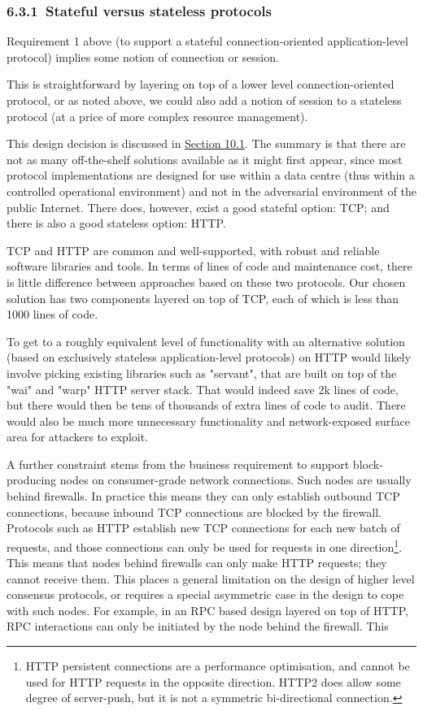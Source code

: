 \documentclass[]{article}
\begin{document}
\hypertarget{stateful-versus-stateless-protocols}{%
\subsubsection{​6.3.1​~Stateful versus stateless
protocols}\label{stateful-versus-stateless-protocols}}

Requirement 1 above (to support a stateful connection-oriented
application-level protocol) implies some notion of connection or
session.

This is straightforward by layering on top of a lower level
connection-oriented protocol, or as noted above, we could also add a
notion of session to a stateless protocol (at a price of more complex
resource management).

This design decision is discussed in
\protect\hyperlink{stateful-implementation}{{Section 10.1}}. The summary
is that there are not as many off-the-shelf solutions available as it
might first appear, since most protocol implementations are designed for
use within a data centre (thus within a controlled operational
environment) and not in the adversarial environment of the public
Internet. There does, however, exist a good stateful option: TCP; and
there is also a good stateless option: HTTP.

TCP and HTTP are common and well-supported, with robust and reliable
software libraries and tools. In terms of lines of code and maintenance
cost, there is little difference between approaches based on these two
protocols. Our chosen solution has two components layered on top of TCP,
each of which is less than 1000 lines of code.

To get to a roughly equivalent level of functionality with an
alternative solution (based on exclusively stateless application-level
protocols) on HTTP would likely involve picking existing libraries such
as "servant", that are built on top of the "wai" and "warp" HTTP server
stack. That would indeed save 2k lines of code, but there would then be
tens of thousands of extra lines of code to audit. There would also be
much more unnecessary functionality and network-exposed surface area for
attackers to exploit.

A further constraint stems from the business requirement to support
block-producing nodes on consumer-grade network connections. Such nodes
are usually behind firewalls. In practice this means they can only
establish outbound TCP connections, because inbound TCP connections are
blocked by the firewall. Protocols such as HTTP establish new TCP
connections for each new batch of requests, and those connections can
only be used for requests in one direction\footnote{HTTP persistent
  connections are a performance optimisation, and cannot be used for
  HTTP requests in the opposite direction. HTTP2 does allow some degree
  of server-push, but it is not a symmetric bi-directional connection.}.
This means that nodes behind firewalls can only make HTTP requests; they
cannot receive them. This places a general limitation on the design of
higher level consensus protocols, or requires a special asymmetric case
in the design to cope with such nodes. For example, in an RPC based
design layered on top of HTTP, RPC interactions can only be initiated by
the node behind the firewall. This
\end{document}
